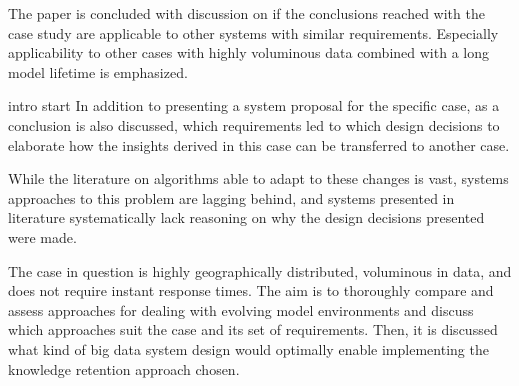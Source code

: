 The paper is concluded with discussion on if the conclusions reached with the case study are applicable to other systems with similar requirements. Especially applicability to other cases with highly voluminous data combined with a long model lifetime is emphasized.

intro start
In addition to presenting a system proposal for the specific case, as a conclusion is also discussed, which requirements led to which design decisions to elaborate how the insights derived in this case can be transferred to another case.

While the literature on algorithms able to adapt to these changes is vast, systems approaches to this problem are lagging behind, and systems presented in literature systematically lack reasoning on why the design decisions presented were made.

 The case in question is highly geographically distributed, voluminous in data, and does not require instant response times. The aim is to thoroughly compare and assess approaches for dealing with evolving model environments and discuss which approaches suit the case and its set of requirements. Then, it is discussed what kind of big data system design would optimally enable implementing the knowledge retention approach chosen.